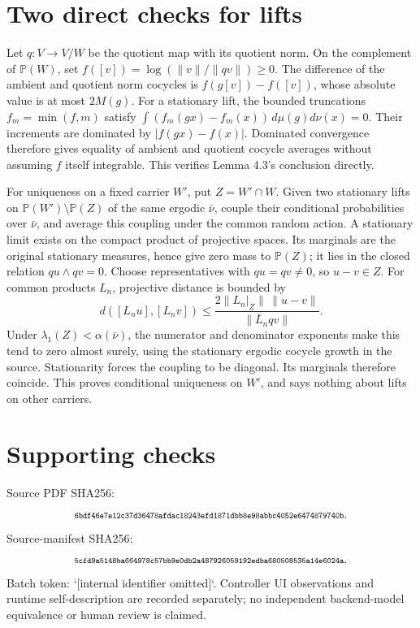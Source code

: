 \documentclass[10pt]{article}
\begin{document}
\section*{Two direct checks for lifts}
Let \(q:V\to V/W\) be the quotient map with its quotient norm. On the complement of \(\mathbb P(W)\), set \(f([v])=\log(\|v\|/\|qv\|)\geq0\). The difference of the ambient and quotient norm cocycles is \(f(g[v])-f([v])\), whose absolute value is at most \(2M(g)\). For a stationary lift, the bounded truncations \(f_m=\min(f,m)\) satisfy \(\int(f_m(gx)-f_m(x))\,d\mu(g)d\nu(x)=0\). Their increments are dominated by \(|f(gx)-f(x)|\). Dominated convergence therefore gives equality of ambient and quotient cocycle averages without assuming \(f\) itself integrable. This verifies Lemma 4.3’s conclusion directly.\par
For uniqueness on a fixed carrier \(W'\), put \(Z=W'\cap W\). Given two stationary lifts on \(\mathbb P(W')\setminus\mathbb P(Z)\) of the same ergodic \(\bar\nu\), couple their conditional probabilities over \(\bar\nu\), and average this coupling under the common random action. A stationary limit exists on the compact product of projective spaces. Its marginals are the original stationary measures, hence give zero mass to \(\mathbb P(Z)\); it lies in the closed relation \(qu\wedge qv=0\). Choose representatives with \(qu=qv\ne0\), so \(u-v\in Z\). For common products \(L_n\), projective distance is bounded by \[d([L_nu],[L_nv])
 \leq \frac{2\|L_n|_Z\|\,\|u-v\|}{\|\bar L_n qv\|}.\] Under \(\lambda_1(Z)<\alpha(\bar\nu)\), the numerator and denominator exponents make this tend to zero almost surely, using the stationary ergodic cocycle growth in the source. Stationarity forces the coupling to be diagonal. Its marginals therefore coincide. This proves conditional uniqueness on \(W'\), and says nothing about lifts on other carriers.\par
\section*{Supporting checks}
Source PDF SHA256: \[\text{\scriptsize\texttt{6bdf46e7e12c37d36478afdac18243efd1871dbb8e98abbc4052e6474879740b}}.\] Source-manifest SHA256: \[\text{\scriptsize\texttt{5cfd9a5148ba664978c57bb9e0db2a487926059192edba680508535a14e6024a}}.\] Batch token: `[internal identifier omitted]`. Controller UI observations and runtime self-description are recorded separately; no independent backend-model equivalence or human review is claimed.\par
\end{document}
